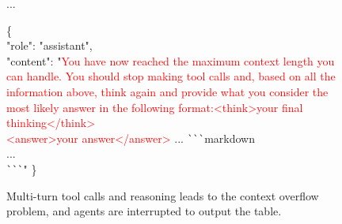 \documentclass[11pt, letterpaper, logo, onecolumn, copyright, numbering]{paper_improved}
\begin{document}
\begin{figure}[htbp]
    \begin{tcolorbox}[title=Multi-turn Converation of WebSailor (GPT-5), colback=green!12]
    ...
        \begin{tcolorbox}[colback=green!6,colframe=green!30,boxrule=0.3pt,arc=0.6mm,sharp corners, left=1.5mm,right=1.5mm,top=1mm,bottom=1mm,breakable]
              \ttfamily\footnotesize
                \{\\
                    \hspace*{15pt}"role": "assistant",\\
                    \hspace*{15pt}"content": "\textcolor{red}{You have now reached the maximum context length you can handle. You should stop making tool calls and, based on all the information above, think again and provide what you consider the most likely answer in the following format:<think>your final thinking</think>\\<answer>your answer</answer>} ... \verb|```|markdown\\...\\\verb|```|"
              \}
        \end{tcolorbox}
    \end{tcolorbox}

\caption{Multi-turn tool calls and reasoning leads to the context overflow problem, and agents are interrupted to output the table.}
\label{fig:case_context_overflow}
\end{figure}

\end{document}
